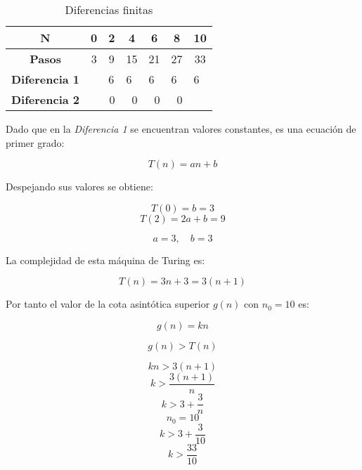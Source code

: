 \documentclass{uc3mpracticas}
\begin{document}
  \begin{table}[!h]
    \centering
  \begin{tabular}{|c|p{1cm}|p{1cm}|p{1cm}|p{1cm}|p{1cm}|p{1cm}|}
  \hline
  \textbf{N}     & \multicolumn{1}{c|}{\textbf{0}} & \multicolumn{1}{c|}{\textbf{2}} & \multicolumn{1}{c|}{\textbf{4}} & \multicolumn{1}{c|}{\textbf{6}} & \multicolumn{1}{c|}{\textbf{8}} & \multicolumn{1}{c|}{\textbf{10}} \\ \hline
  \textbf{Pasos} & \multicolumn{1}{c|}{3}          & \multicolumn{1}{c|}{9}          & \multicolumn{1}{c|}{15}         & \multicolumn{1}{c|}{21}         & \multicolumn{1}{c|}{27}         & \multicolumn{1}{c|}{33}          \\ \hline
  \textbf{Diferencia 1}                  &                                                         & 6                                                       & 6                               & 6                              & 6                              & 6                               \\ \hline
  \textbf{Diferencia 2}                  &                                                         & \multicolumn{1}{r|}{0}                                  & \multicolumn{1}{r|}{0}          & \multicolumn{1}{r|}{0}          & \multicolumn{1}{r|}{0}          &                                  \\ \hline
  \end{tabular}
  \caption{Diferencias finitas}
  \end{table}






  Dado que en la \textit{Diferencia 1} se encuentran valores constantes, es una ecuación de primer grado:


  $$ T(n) = an+ b $$

  Despejando sus valores se obtiene:

  $$ T(0) = b = 3 $$
  $$ T(2) = 2a + b = 9 $$

  $$ a = 3 , \quad b = 3$$

  La complejidad de esta máquina de Turing es:

  $$ T(n) = 3n + 3 = 3(n+1) $$

  Por tanto el valor de la cota asintótica superior $g(n)$ con $n_0 = 10$ es:

  $$ g(n) = kn $$

  $$ g(n) > T(n) $$

  $$ kn > 3(n+1) $$
  $$ k > \frac{3(n+1)}{n} $$
  $$ k > 3 + \frac{3}{n} $$
  $$ n_0 = 10 $$
  $$ k > 3 + \frac{3}{10} $$
  $$ k > \frac{33}{10} $$
\end{document}
